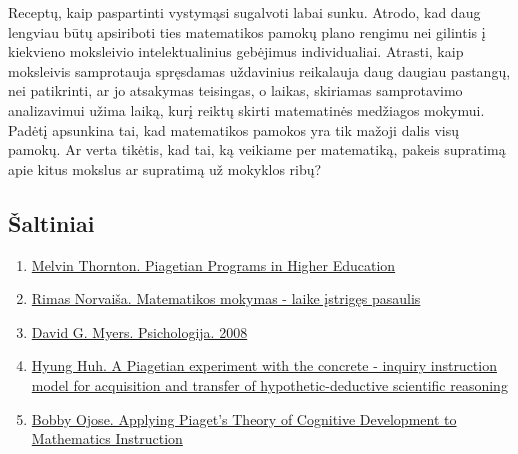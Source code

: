 \documentclass{article}
\begin{document}
Receptų, kaip paspartinti vystymąsi sugalvoti labai sunku. Atrodo, kad daug lengviau būtų apsiriboti ties matematikos pamokų plano rengimu nei gilintis į kiekvieno moksleivio intelektualinius gebėjimus individualiai. Atrasti, kaip moksleivis samprotauja spręsdamas uždavinius reikalauja daug daugiau pastangų, nei patikrinti, ar jo atsakymas teisingas, o laikas, skiriamas samprotavimo analizavimui užima laiką, kurį reiktų skirti matematinės medžiagos mokymui. Padėtį apsunkina tai, kad matematikos pamokos yra tik mažoji dalis visų pamokų. Ar verta tikėtis, kad tai, ką veikiame per matematiką, pakeis supratimą apie kitus mokslus ar supratimą už mokyklos ribų?

\subsection{Šaltiniai}
\begin{enumerate}
\item \href{http://digitalcommons.unl.edu/cgi/viewcontent.cgi?article=1013\&context=adaptessays}{Melvin Thornton. Piagetian Programs in Higher Education}

\item \href{norvaisa.lt/wp-content/uploads/2012/07/laike-istriges-pasaulis.pdf}{Rimas Norvaiša. Matematikos mokymas - laike įstrigęs pasaulis}

\item \href{https://www.dropbox.com/s/vyghsx7k1ivd86g/David\%20G.\%20Myers\%20Psichologija\%202008.pdf?dl=0}{David G. Myers. Psichologija. 2008}

\item \href{https://pdfs.semanticscholar.org/3fbd/493c9bfa3d5a96bc2f82f8677b1de5b35b40.pdf\_ga=2.93207450.649401276.1573859970-917910527.1573859970}{Hyung Huh. A Piagetian experiment with the concrete - inquiry instruction model for acquisition and transfer of hypothetic-deductive scientific reasoning}

\item \href{https://files.eric.ed.gov/fulltext/EJ841568.pdf}{Bobby Ojose. Applying Piaget's Theory of Cognitive Development to Mathematics Instruction}
\end{enumerate}
\end{document}
